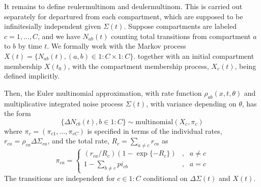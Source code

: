 \documentclass[12p]{article}
\begin{document}
It remains to define reulermultinom and deulermultinom. This is carried out separately for departured from each compartment, which are supposed to be infinitesially independent given $\Sigma(t)$.
Suppose compartments are labeled $c=1,\dots,C$, and we have $N_{ab}(t)$ counting total transitions from compartment $a$ to $b$ by time $t$.
We formally work with the Markov process $X(t)=\{N_{ab}(t), (a,b)\in 1:C \times 1:C\}$. together with an initial compartment membership $X(t_0)$, with the compartment membership process, $X_c(t)$, being defined implicitly.

Then, the Euler multinomial approximation, with rate function $\rho_{ab}(x,t,\theta)$ and multiplicative integrated noise process $\Sigma(t)$, with variance depending on $\theta$, has the form
\[
\{\Delta N_{cb}(t), b\in 1:C \} \sim \mathrm{multinomial}(X_c,\pi_{c})
\]
where $\pi_c=(\pi_{c1},\dots,\pi_{cC})$ is specified in terms of the individual rates, $r_{ca}=\rho_{ca}\Delta\Sigma_{ca}$, and the total rate, $R_c=\sum_{a\neq c}r_{ca}$ as
\[
\pi_{ca}=\left\{
  \begin{array}{lcl}
    (r_{ca}/R_c) (1-\exp\{-R_c\}) &,& a\neq c \\
    1-\sum_{b\neq c} pi_{cb} &,& a=c
  \end{array}
  \right.
  \]
The transitions are independent for $c\in 1:C$ conditional on $\Delta\Sigma(t)$ and $X(t)$.
\end{document}
